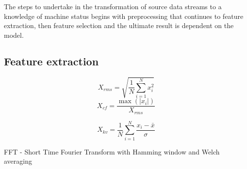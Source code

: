 The steps to undertake in the transformation of source data streams to a knowledge of machine status begins with
preprocessing that continues to feature extraction, then feature selection and the ultimate result is dependent on the model.

\subsection{Feature extraction}
\cite{zheng_feature_2018}
\cite{johnson_feature_2019}

\cite{mostafavi_novel_2021}

\cite{altaf_new_2022}
$$X_{rms} = \sqrt{\frac{1}{N} \sum_{i=1}^{N}{x_i^2}}$$  %
$$X_{cf} = \frac{\max(|x_i|)}{X_{rms}}$$  %

$$ $$%
$$X_{kv} = \frac{1}{N}  \sum_{i=1}^{N}{\frac{x_i - \bar{x}}{\sigma}} $$ %


\cite{brito_fault_2021}

FFT - Short Time Fourier Transform with Hamming window and Welch averaging


\cite{peeters_large_2004}
\cite{zhuo_research_2022}
\cite{mohammadi_early_2020}
\cite{egaji_data_2020}
\cite{nandi_condition_2019}

